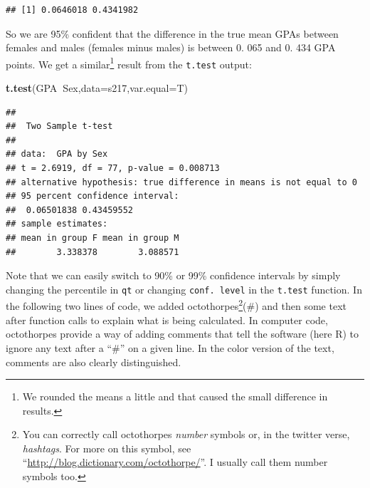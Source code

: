 \documentclass[]{book}
\newenvironment{Shaded}{\begin{snugshade}}{\end{snugshade}}
\newcommand{\KeywordTok}[1]{\textcolor[rgb]{0.13,0.29,0.53}{\textbf{#1}}}
\newcommand{\DataTypeTok}[1]{\textcolor[rgb]{0.13,0.29,0.53}{#1}}
\newcommand{\DecValTok}[1]{\textcolor[rgb]{0.00,0.00,0.81}{#1}}
\newcommand{\CommentTok}[1]{\textcolor[rgb]{0.56,0.35,0.01}{\textit{#1}}}
\newcommand{\OperatorTok}[1]{\textcolor[rgb]{0.81,0.36,0.00}{\textbf{#1}}}
\newcommand{\NormalTok}[1]{#1}
\let\rmarkdownfootnote\footnote%
\def\footnote{\protect\rmarkdownfootnote}
\theoremstyle{definition}
\theoremstyle{definition}
\theoremstyle{remark}
\begin{document}
\begin{verbatim}
## [1] 0.0646018 0.4341982
\end{verbatim}

So we are 95\% confident that the difference in the true mean GPAs
between females and males (females minus males) is between 0. 065 and 0.
434 GPA points. We get a similar\footnote{We rounded the means a little
  and that caused the small difference in results.} result from the
\texttt{t.test} output:

\begin{Shaded}
\begin{Highlighting}[]
\KeywordTok{t.test}\NormalTok{(GPA}\OperatorTok{~}\NormalTok{Sex,}\DataTypeTok{data=}\NormalTok{s217,}\DataTypeTok{var.equal=}\NormalTok{T)}
\end{Highlighting}
\end{Shaded}

\begin{verbatim}
## 
##  Two Sample t-test
## 
## data:  GPA by Sex
## t = 2.6919, df = 77, p-value = 0.008713
## alternative hypothesis: true difference in means is not equal to 0
## 95 percent confidence interval:
##  0.06501838 0.43459552
## sample estimates:
## mean in group F mean in group M 
##        3.338378        3.088571
\end{verbatim}

Note that we can easily switch to 90\% or 99\% confidence intervals by
simply changing the percentile in \texttt{qt} or changing
\texttt{conf.\ level} in the \texttt{t.test} function. In the following
two lines of code, we added octothorpes\footnote{You can correctly call
  octothorpes \emph{number} symbols or, in the twitter verse,
  \emph{hashtags}. For more on this symbol, see
  ``\url{http://blog.dictionary.com/octothorpe/}''. I usually call them
  number symbols too.}(\#) and then some text after function calls to
explain what is being calculated. In computer code, octothorpes provide
a way of adding comments that tell the software (here R) to ignore any
text after a ``\#'' on a given line. In the color version of the text,
comments are also clearly distinguished.

\begin{Shaded}
\end{Shaded}
\end{document}
